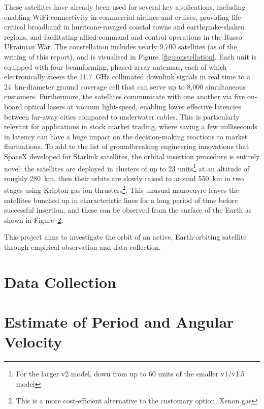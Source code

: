 \documentclass{article}
\begin{document}
These satellites have already been used for several key applications, including enabling WiFi connectivity in commercial airlines and cruises, providing life-critical broadband in hurricane-ravaged coastal towns and earthquake-shaken regions, and facilitating allied command and control operations in the Russo-Ukrainian War. The constellation includes nearly 9,700 satellites (as of the writing of this report), and is visualised in Figure~\ref{fig:constellation}. Each unit is equipped with four beamforming, phased array antennas, each of which electronically steers the \SI{11.7}{\giga\hertz} collimated downlink signals in real time to a \SI{24}{\kilo\metre}-diameter ground coverage cell that can serve up to 8,000 simultaneous customers. Furthermore, the satellites communicate with one another via five on-board optical lasers at vacuum light-speed, enabling lower effective latencies between far-away cities compared to underwater cables. This is particularly relevant for applications in stock market trading, where saving a few milliseconds in latency can have a huge impact on the decision-making reactions to market fluctuations. To add to the list of groundbreaking engineering innovations that SpaceX developed for Starlink satellites, the orbital insertion procedure is entirely novel: the satellites are deployed in clusters of up to 23 units\footnote{For the larger v2 model, down from up to 60 units of the smaller v1/v1.5 model} at an altitude of roughly \SI{280}{\kilo\metre}, then their orbits are slowly raised to around \SI{550}{\kilo\metre} in two stages using Kripton gas ion thrusters\footnote{This is a more cost-efficient alternative to the customary option, Xenon gas}. This unusual manoeuvre leaves the satellites bunched up in characteristic lines for a long period of time before successful insertion, and these can be observed from the surface of the Earth as shown in Figure~\ref{}.

This project aims to investigate the orbit of an active, Earth-orbiting satellite through empirical observation and data collection.







\section{Data Collection}

\section{Estimate of Period and Angular Velocity}
\end{document}
